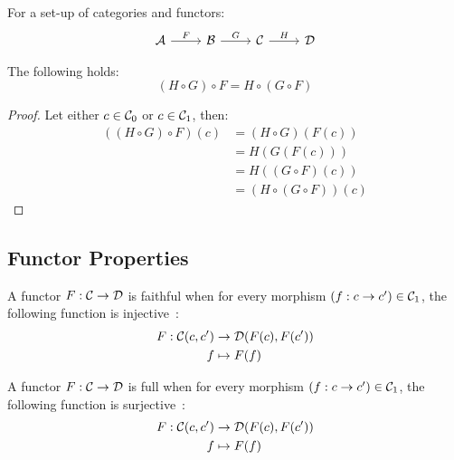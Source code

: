 \begin{theorem}
  For a set-up of categories and functors:
  \[\begin{tikzcd}[ampersand replacement=\&]
    \A \& \B \& \C \& \D
    \arrow["F", from=1-1, to=1-2]
    \arrow["G", from=1-2, to=1-3]
    \arrow["H", from=1-3, to=1-4]
  \end{tikzcd}\]

  The following holds:
  \[(H \circ G) \circ F = H\circ(G\circ F)\]

  \begin{proof}
    Let either $c\in \mathcal{C}_0$ or $c\in \mathcal{C}_1$, then:
    \[
      \begin{aligned}
        ((H \circ G) \circ F) (c)
          &= (H\circ G) (F (c))\\
          &= H(G(F(c)))\\
          &= H((G\circ F)(c))\\
          &= (H\circ(G\circ F)) (c)
      \end{aligned}
    \]
  \end{proof}
\end{theorem}

\subsection{Functor Properties}

\begin{definition}
  A functor $F:\mathcal{C}\to \mathcal{D}$ is faithful when for every morphism $(f: c\to c') \in
  \mathcal{C}_1$, the following function is
  injective~\parencite[p.~25]{leinster:basic_category_theory}:
    \[
      \begin{aligned}
        F: \mathcal{C}(c, c') &\to \mathcal{D}(F(c), F(c'))\\
        f &\mapsto F(f)
      \end{aligned}
    \]
\end{definition}

\begin{definition}
  A functor $F:\mathcal{C}\to \mathcal{D}$ is full when for every morphism $(f: c\to c') \in
  \mathcal{C}_1$, the following function is
  surjective~\parencite[p.~25]{leinster:basic_category_theory}:
  \[
    \begin{aligned}
      F: \mathcal{C}(c, c') &\to \mathcal{D}(F(c), F(c'))\\
      f &\mapsto F(f)
    \end{aligned}
  \]
\end{definition}

